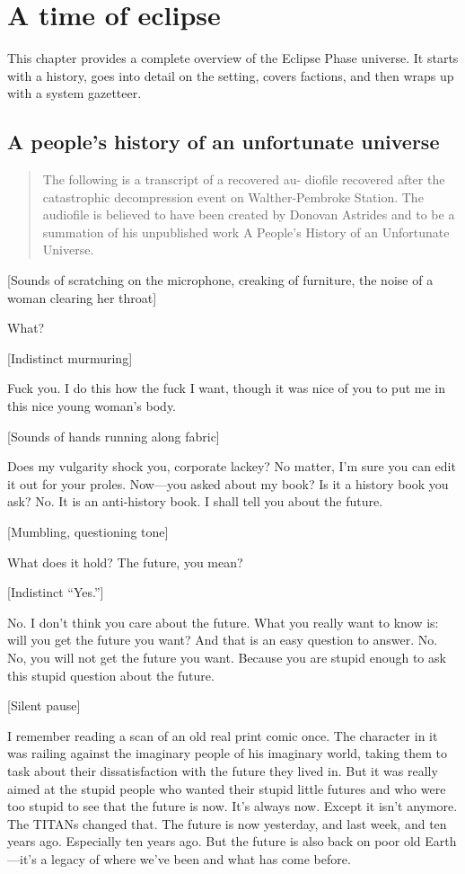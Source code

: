 \chapter{A time of eclipse}
\label{chap:a-time-of-eclipse} 

This chapter provides a complete overview of the Eclipse Phase universe. It starts with a history, goes into detail on the setting, covers factions, and then wraps up with a system gazetteer. 

\section{A people's history of an unfortunate universe}
\label{sec:peoples-history-an} 

\begin{quotation}
The following is a transcript of a recovered au- diofile recovered after the catastrophic decompression event on Walther-Pembroke Station. The audiofile is believed to have been created by Donovan Astrides and to be a summation of his unpublished work A People's History of an Unfortunate Universe.
\end{quotation} 

[Sounds of scratching on the microphone, creaking of furniture, the noise of a woman clearing her throat] 

What? 

[Indistinct murmuring] 

Fuck you. I do this how the fuck I want, though it was nice of you to put me in this nice young woman's body. 

[Sounds of hands running along fabric] 

Does my vulgarity shock you, corporate lackey? No matter, I'm sure you can edit it out for your proles. Now—you asked about my book? Is it a history book you ask? No. It is an anti-history book. I shall tell you about the future. 

[Mumbling, questioning tone] 

What does it hold? The future, you mean? 

[Indistinct “Yes.”] 

No. I don't think you care about the future. What you really want to know is: will you get the future you want? And that is an easy question to answer. No. No, you will not get the future you want. Because you are stupid enough to ask this stupid question about the future. 

[Silent pause] 

I remember reading a scan of an old real print comic once. The character in it was railing against the imaginary people of his imaginary world, taking them to task about their dissatisfaction with the future they lived in. But it was really aimed at the stupid people who wanted their stupid little futures and who were too stupid to see that the future is now. It's always now. Except it isn't anymore. The TITANs changed that. The future is now yesterday, and last week, and ten years ago. Especially ten years ago. But the future is also back on poor old Earth—it's a legacy of where we've been and what has come before. 

